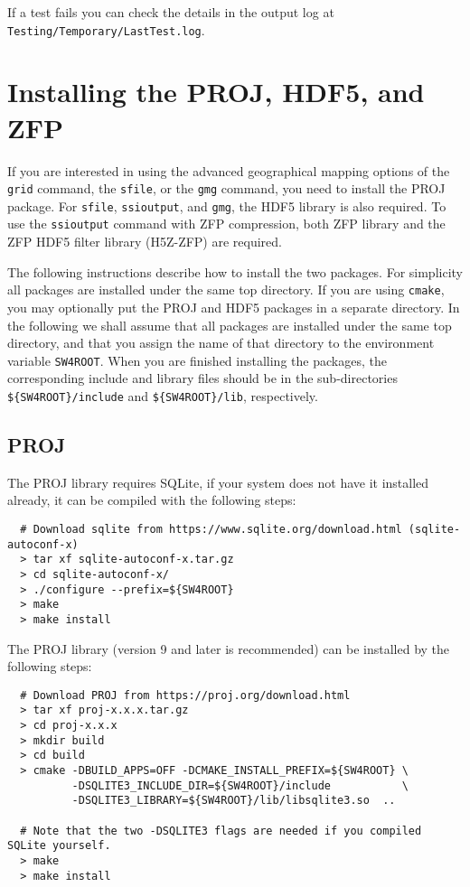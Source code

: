 \documentclass[11pt]{article}
\begin{document}
If a test fails you can check the details in the output log at
\texttt{Testing/Temporary/LastTest.log}.

\section{Installing the PROJ, HDF5, and ZFP}\label{sec:proj}
 

If you are interested in using the advanced geographical mapping options of the {\tt grid} command, the {\tt sfile}, or the {\tt gmg} command, you need to install the PROJ package. For {\tt sfile}, {\tt ssioutput},  and {\tt gmg}, the HDF5 library is also required. To use the {\tt ssioutput} command with ZFP compression, both ZFP library and the ZFP HDF5 filter library (H5Z-ZFP) are required.  

The following instructions describe how to install the two packages. For simplicity all packages
are installed under the same top directory. If you are using {\tt cmake}, you may optionally put the
PROJ and HDF5 packages in a separate directory. In the following we shall assume that all packages are
installed under the same top directory, and that you assign the name of that directory to the
environment variable \verb+SW4ROOT+. When you are finished installing the packages, the
corresponding include and library files should be in the sub-directories \verb+${SW4ROOT}/include+
and \verb+${SW4ROOT}/lib+, respectively.

\subsection{PROJ}
The PROJ library requires SQLite, if your system does not have it installed already, it can be compiled with the following steps:
\begin{verbatim}
  # Download sqlite from https://www.sqlite.org/download.html (sqlite-autoconf-x)
  > tar xf sqlite-autoconf-x.tar.gz
  > cd sqlite-autoconf-x/
  > ./configure --prefix=${SW4ROOT}
  > make
  > make install
\end{verbatim}

The PROJ library (version 9 and later is recommended) can be installed by the following steps:

\begin{verbatim}
  # Download PROJ from https://proj.org/download.html
  > tar xf proj-x.x.x.tar.gz
  > cd proj-x.x.x
  > mkdir build
  > cd build
  > cmake -DBUILD_APPS=OFF -DCMAKE_INSTALL_PREFIX=${SW4ROOT} \
          -DSQLITE3_INCLUDE_DIR=${SW4ROOT}/include           \
          -DSQLITE3_LIBRARY=${SW4ROOT}/lib/libsqlite3.so  ..

  # Note that the two -DSQLITE3 flags are needed if you compiled SQLite yourself.
  > make
  > make install
\end{verbatim}
\end{document}
